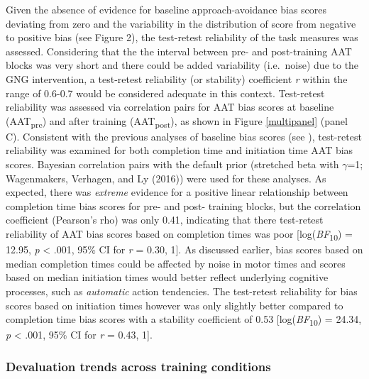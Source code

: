 \documentclass[man,floatsintext]{apa6}
\begin{document}
Given the absence of evidence for baseline approach-avoidance bias scores deviating from zero and the variability in the distribution of score from negative to positive bias (see Figure 2), the test-retest reliability of the task measures was assessed. Considering that the the interval between pre- and post-training AAT blocks was very short and there could be added variability (i.e.~noise) due to the GNG intervention, a test-retest reliability (or stability) coefficient \emph{r} within the range of 0.6-0.7 would be considered adequate in this context. Test-retest reliability was assessed via correlation pairs for AAT bias scores at baseline (AAT\textsubscript{pre}) and after training (AAT\textsubscript{post}), as shown in Figure \ref{multipanel} (panel C). Consistent with the previous analyses of baseline bias scores (see \textit{}), test-retest reliability was examined for both completion time and initiation time AAT bias scores. Bayesian correlation pairs with the default prior (stretched beta with \(\gamma\)=1; Wagenmakers, Verhagen, and Ly (2016)) were used for these analyses. As expected, there was \emph{extreme} evidence for a positive linear relationship between completion time bias scores for pre- and post- training blocks, but the correlation coefficient (Pearson's rho) was only 0.41, indicating that there test-retest reliability of AAT bias scores based on completion times was poor {[}log(\textit{BF}\textsubscript{10}) = 12.95, \emph{p} \textless{} .001, 95\% CI for \emph{r} = 0.30, 1{]}. As discussed earlier, bias scores based on median completion times could be affected by noise in motor times and scores based on median initiation times would better reflect underlying cognitive processes, such as \emph{automatic} action tendencies. The test-retest reliability for bias scores based on initiation times however was only slightly better compared to completion time bias scores with a stability coefficient of 0.53 {[}log(\textit{BF}\textsubscript{10}) = 24.34, \emph{p} \textless{} .001, 95\% CI for \emph{r} = 0.43, 1{]}.

\hypertarget{devaluation_trends}{%
\subsubsection{Devaluation trends across training conditions}\label{devaluation_trends}}
\end{document}
